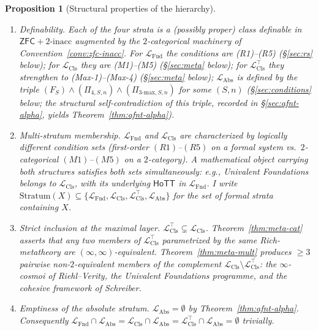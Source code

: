 \documentclass[11pt]{article}
\theoremstyle{plain}
\newtheorem{proposition}[theorem]{Proposition}
\theoremstyle{definition}
\newcommand{\LFnd}{\mathcal{L}_{\mathrm{Fnd}}}
\newcommand{\LCls}{\mathcal{L}_{\mathrm{Cls}}}
\newcommand{\LClsMax}{\mathcal{L}_{\mathrm{Cls}}^{\top}}
\newcommand{\LAbs}{\mathcal{L}_{\mathrm{Abs}}}
\newcommand{\ZFC}{\mathsf{ZFC}}
\newcommand{\HoTT}{\mathsf{HoTT}}
\begin{document}
\begin{proposition}[Structural properties of the hierarchy]\label{prop:level-structure}
\begin{enumerate}
\item[\textbf{(i)}] \emph{Definability.} Each of the four strata is a (possibly proper) class definable in $\ZFC + 2\text{-inacc}$ augmented by the $2$-categorical machinery of Convention~\ref{conv:zfc-inacc}. For $\LFnd$ the conditions are (R1)--(R5) (\S\ref{sec:rs} below); for $\LCls$ they are (M1)--(M5) (\S\ref{sec:meta} below); for $\LClsMax$ they strengthen to (Max-1)--(Max-4) (\S\ref{sec:meta} below); $\LAbs$ is defined by the triple $(F_S) \wedge (\Pi_{4, S, n}) \wedge (\Pi_{3\text{-max}, S, n})$ for some $(S, n)$ (\S\ref{sec:conditions} below; the structural self-contradiction of this triple, recorded in \S\ref{sec:afnt-alpha}, yields Theorem~\ref{thm:afnt-alpha}).
\item[\textbf{(ii)}] \emph{Multi-stratum membership.} $\LFnd$ and $\LCls$ are characterized by logically different condition sets (first-order $(R1)$--$(R5)$ on a formal system vs.\ $2$-categorical $(M1)$--$(M5)$ on a $2$-category). A mathematical object carrying both structures satisfies both sets simultaneously: e.g., Univalent Foundations belongs to $\LCls$, with its underlying $\HoTT$ in $\LFnd$. I write $\mathrm{Stratum}(X) \subseteq \{\LFnd, \LCls, \LClsMax, \LAbs\}$ for the set of formal strata containing $X$.
\item[\textbf{(iii)}] \emph{Strict inclusion at the maximal layer.} $\LClsMax \subsetneq \LCls$. Theorem~\ref{thm:meta-cat} asserts that any two members of $\LClsMax$ parametrized by the same Rich-metatheory are $(\infty, \infty)$-equivalent. Theorem~\ref{thm:meta-mult} produces $\geq 3$ pairwise non-$2$-equivalent members of the complement $\LCls \setminus \LClsMax$: the $\infty$-cosmoi of Riehl--Verity, the Univalent Foundations programme, and the cohesive framework of Schreiber.
\item[\textbf{(iv)}] \emph{Emptiness of the absolute stratum.} $\LAbs = \emptyset$ by Theorem~\ref{thm:afnt-alpha}. Consequently $\LFnd \cap \LAbs = \LCls \cap \LAbs = \LClsMax \cap \LAbs = \emptyset$ trivially.
\end{enumerate}
\end{proposition}
\end{document}
